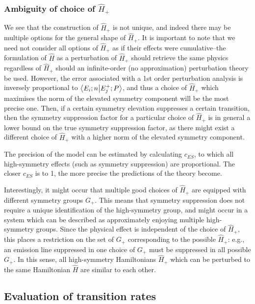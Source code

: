 \documentclass[12pt]{article}
\begin{document}
	\subsubsection{Ambiguity of choice of $\hat{H}_+$}\label{sec:ambiguity}
	We see that the construction of $\hat{H}_+$ is not unique, and indeed there may be multiple options for the general shape of $\hat{H}_+$. It is important to note that we need not consider all options of $\hat{H}_+$ as if their effects were cumulative--the formulation of $\hat{H}$ as a perturbation of $\hat{H}_+$ should retrieve the same physics regardless of $\hat{H}_+$ should an infinite-order (no approximation) perturbation theory be used. However, the error associated with a 1st order perturbation analysis is inversely proportional to $\braket{E_i;n}{E_j^+;P}$, and thus a choice of $\hat{H}_+$ which maximises the norm of the elevated symmetry component will be the most precise one. Then, if a certain symmetry elevation suppresses a certain transition, then the symmetry suppression factor for a particular choice of $\hat{H}_+$ is in general a lower bound on the true symmetry suppression factor, as there might exist a different choice of $\hat{H}_+$ with a higher norm of the elevated symmetry component.
	
	The precision of the model can be estimated by calculating $c_{ES}$, to which all high-symmetry effects (such as symmetry suppression) are proportional. The closer $c_{ES}$ is to 1, the more precise the predictions of the theory become.
	
	Interestingly, it might occur that multiple good choices of $\hat{H}_+$ are equipped with different symmetry groups $G_+$. This means that symmetry suppression does not require a unique identification of the high-symmetry group, and might occur in a system which can be described as approximately enjoying multiple high-symmetry groups. Since the physical effect is independent of the choice of $\hat{H}_+$, this places a restriction on the set of $G_+$ corresponding to the possible $\hat{H}_+$: e.g., an emission line suppressed in one choice of $G_+$ must be suppressed in all possible $G_+$. In this sense, all high-symmetry Hamiltonians $\hat{H}_+$ which can be perturbed to the same Hamiltonian $\hat{H}$ are similar to each other.
	
	\subsection{Evaluation of transition rates}
	
\end{document}
